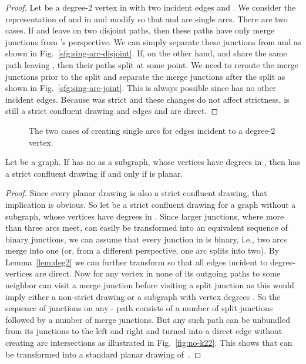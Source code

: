 \documentclass{llncs}
\begin{document}
\begin{proof}
  Let  be a degree-2 vertex in  with two incident edges  and . We consider the representation of  and  in  and modify  so that  and  are single arcs. There are two cases. If  and  leave  on two disjoint paths, then these paths have only merge junctions from 's perspective. We can simply separate these junctions from  and  as shown in Fig.~\ref{sfg:sing-arc-disjoint}. If, on the other hand,  and  share the same path leaving , then their paths split at some point. We need to reroute the merge junctions prior to the split and separate the merge junctions after the split as shown in Fig.~\ref{sfg:sing-arc-joint}. This is always possible since  has no other incident edges. Because  was strict and these changes do not affect strictness,  is still a strict confluent drawing and edges  and  are direct.
\end{proof}

\begin{figure}[htbp]
  \centering
  \hfill  {}
  \caption{The two cases of creating single arcs for edges incident to a degree-2 vertex.}
  \label{fig:single-arc}
\end{figure}

\begin {lemma} \label {lem:k22}
  Let  be a graph. If  has no  as a subgraph, whose vertices have degrees  in , then  has a strict confluent drawing if and only if  is planar.
\end {lemma}

\begin{proof}
  Since every planar drawing is also a strict confluent drawing, that implication is obvious.
	So let  be a strict confluent drawing for a graph  without a  subgraph, whose vertices have degrees  in . Since larger junctions, where more than three arcs meet, can easily be transformed into an equivalent sequence of binary junctions, we can assume that every junction in  is binary, i.e., two arcs merge into one (or, from a different perspective, one arc splits into two).
	By Lemma~\ref{lem:deg2} we can further transform  so that all edges incident to degree- vertices are direct.
	Now for any vertex  in  none of its outgoing paths to some neighbor  can visit a merge junction before visiting a split junction as this would imply either a non-strict drawing or a  subgraph with vertex degrees . So the sequence of junctions on any - path consists of a number of split junctions followed by a number of merge junctions. But any such path can be unbundled from its junctions to the left and right and turned into a direct edge without creating arc intersections  as illustrated in Fig.~\ref{fig:no-k22}. This shows that  can be transformed into a standard planar drawing of~.
\end{proof}
\end{document}

